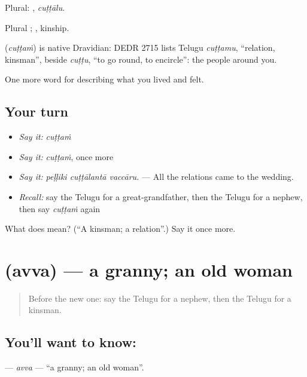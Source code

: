Plural: , \emph{cuṭṭālu}.

Plural ; , kinship.

\begin{cousinweb}
\textbf{} (\emph{cuṭṭaṁ}) is native Dravidian: DEDR 2715 lists Telugu \emph{cuṭṭamu}, \textquotedblleft{}relation, kinsman\textquotedblright{}, beside \emph{cuṭṭu}, \textquotedblleft{}to go round, to encircle\textquotedblright{}: the people around you.
\end{cousinweb}

\begin{grammarlens}[title={What you've built}]
One more word for describing what you lived and felt.
\end{grammarlens}

\subsection*{Your turn}
\begin{itemize}
\raggedright
  \item \emph{Say it:} \emph{cuṭṭaṁ}
  \item \emph{Say it:} \emph{cuṭṭaṁ}, once more
  \item \emph{Say it:} \emph{peḷḷiki cuṭṭālantā vaccāru.} — All the relations came to the wedding.
  \item \emph{Recall:} say the Telugu for a great-grandfather, then the Telugu for a nephew, then say \emph{cuṭṭaṁ} again
\end{itemize}

\begin{tcolorbox}[breakable,colback=teal!4,colframe=teal!35!black,title={Before you move on}]
What does  mean? (\textquotedblleft{}A kinsman; a relation\textquotedblright{}.) Say it once more.
\end{tcolorbox}
\section[\texorpdfstring{\te{అవ్వ} (avva)}{అవ్వ (avva)}]{ (avva) — a granny; an old woman}

\label{lesson:TE-C530-avva}



\begin{quote}
Before the new one: say the Telugu for a nephew, then the Telugu for a kinsman.
\end{quote}

\subsection*{You'll want to know: }
\textbf{} — \emph{avva} — \textquotedblleft{}a granny; an old woman\textquotedblright{}.

